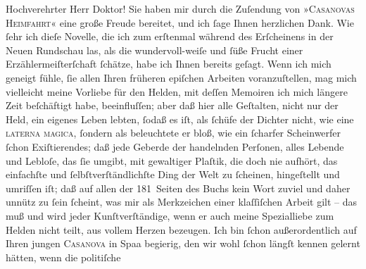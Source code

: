 \pstart\center{}Hochverehrter Herr Doktor!\pend\vspace{0.5em}
\pstart
           Sie haben mir durch die Zuſendung von »\textsc{Casanovas Heimfahrt}« eine große Freude bereitet, und ich{ }ſage Ihnen herzlichen Dank. Wie{ }ſehr ich
               dieſe Novelle, die ich zum
               erſtenmal während des Erſcheinens in der Neuen
                  Rundschau las, als die wundervoll-weiſe und{ }ſüße Frucht einer
               Erzählermeiſterſchaft{ }ſchätze, habe ich Ihnen bereits geſagt. Wenn ich mich geneigt
               fühle,{ }ſie allen Ihren früheren epiſchen Arbeiten voranzuſtellen, mag mich vielleicht
               meine Vorliebe für den Helden, mit deſſen Memoiren ich mich längere Zeit beſchäftigt
               habe, beeinfluſſen; aber daß hier alle Geſtalten, nicht nur der Held, ein eigenes
               Leben lebten,{ }ſodaß es iſt, als{ }ſchüfe der Dichter nicht, wie eine \textsc{laterna magica},{ }ſondern als beleuchtete er bloß, wie ein{ }ſcharfer Scheinwerfer{ }ſchon Exiſtierendes; daß jede Geberde der handelnden Perſonen,
               alles {\pb}Lebende und Lebloſe, das{ }ſie
               umgibt, mit gewaltiger Plaſtik, die doch nie aufhört, das einfachſte und{ }ſelbſtverſtändlichſte Ding der Welt zu{ }ſcheinen, hingeſtellt und umriſſen iſt; daß
               auf allen der 181 Seiten des Buchs kein Wort zuviel und daher unnütz zu{ }ſein{ }ſcheint, was mir als
               Merkzeichen einer klaſſiſchen Arbeit gilt – das muß und wird jeder Kunſtverſtändige,
               wenn er auch meine Spezialliebe zum Helden nicht teilt, aus vollem Herzen bezeugen.
               Ich bin{ }ſchon außerordentlich auf Ihren jungen \textsc{Casanova} in Spaa begierig, den wir wohl{ }ſchon längſt kennen gelernt hätten, wenn die politiſche
